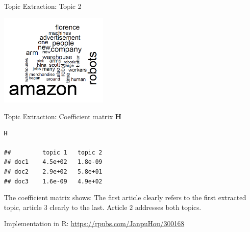 \begin{vbframe}{Topic Extraction: Topic 2}
\lz
\begin{center}
	\includegraphics[width = 0.4\textwidth]{figure_man/wordcloud02.png}
\end{center}




\end{vbframe}

\begin{vbframe}{Topic Extraction: Coefficient matrix $\mathbf{H}$}

\footnotesize
\vspace{0.3cm}
\begin{verbatim}
H

##         topic 1   topic 2
## doc1    4.5e+02   1.8e-09
## doc2    2.9e+02   5.8e+01
## doc3    1.6e-09   4.9e+02
\end{verbatim}



\normalsize
The coefficient matrix shows: The first article clearly refers to the first extracted topic, article 3 clearly to the last.
Article 2 addresses both topics.

\vfill

\begin{footnotesize}
Implementation in R: \url{https://rpubs.com/JanpuHou/300168}
\end{footnotesize}

\end{vbframe}

\endlecture








